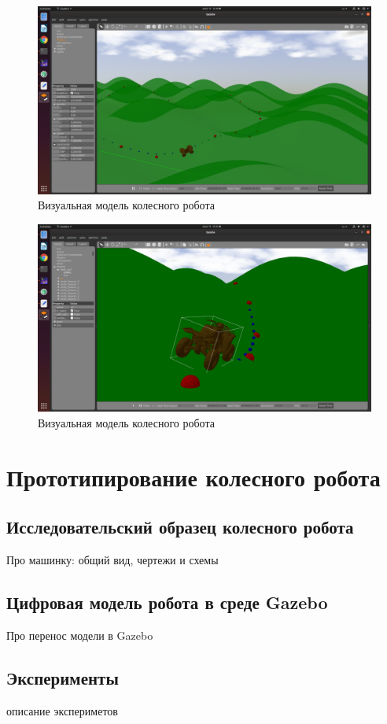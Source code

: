 \documentclass[a4paper,12pt]{article}
\begin{document}
\begin{figure}[h!]
	\centering
	\includegraphics[width=14cm,clip]{pic/kin_gazebo}
	\caption{Визуальная модель колесного робота}
	\label{pic:kin_gazebo}
\end{figure}

\begin{figure}[h!]
	\centering
	\includegraphics[width=14cm,clip]{pic/kin_gazebo2}
	\caption{Визуальная модель колесного робота}
	\label{pic:kin_gazebo2}
\end{figure}


\section{Прототипирование колесного робота}
\subsection{Исследовательский образец колесного робота}
Про машинку: общий вид, чертежи и схемы
\subsection{Цифровая модель робота в среде Gazebo}
Про перенос модели в Gazebo
\subsection{Эксперименты}
описание экспериметов


\section{}
\end{document}
